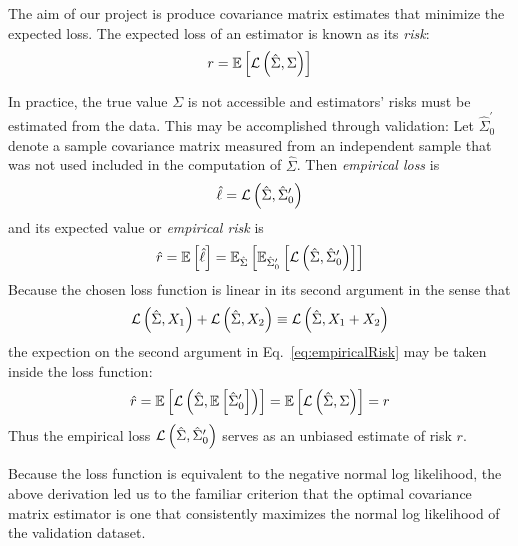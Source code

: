 The aim of our project is produce covariance matrix estimates that minimize the expected loss.  The expected loss of an estimator is known as its \emph{risk}: 
\begin{equation}
r = \mathbb E\left[ \mathcal L\left(\hat\Sigma, \Sigma\right)\right]
\end{equation}

In practice, the true value $\Sigma$ is not accessible and estimators' risks must be estimated from the data.  This may be accomplished through validation: 
Let $\hat\Sigma_0^\prime$ denote a sample covariance matrix measured from an independent sample that was not used included in the computation of $\hat\Sigma$. Then \emph{empirical loss} is 
\begin{equation}
\hat \ell = \mathcal L\left(\hat\Sigma,\hat\Sigma_0^\prime\right)
\end{equation}
 and its expected value or \emph{empirical risk} is
 \begin{equation}\label{eq:empiricalRisk}
 \hat r = \mathbb E\left[ \hat\ell\right] = \mathbb E_{\hat\Sigma} \left[ \mathbb E_{\hat\Sigma_0^\prime} \left[ {\mathcal L\left(\hat\Sigma,\hat\Sigma_0^\prime\right)} \right] \right]
 \end{equation}
 Because the chosen loss function is linear in its second argument in the sense that
 \begin{equation}
 \mathcal L\left(\hat\Sigma,X_1\right) + \mathcal L\left(\hat\Sigma,X_2\right) \equiv \mathcal L\left(\hat\Sigma,X_1+X_2\right)
 \end{equation}
 the expection on the second argument in Eq.~\ref{eq:empiricalRisk} may be taken inside the loss function:
 \begin{equation}
 \hat r = \mathbb E\left[ \mathcal L\left(\hat\Sigma,\mathbb E\left[ \hat\Sigma_0^\prime\right]\right)\right]  = \mathbb E\left[ \mathcal L\left(\hat\Sigma,\Sigma\right)\right] = r
 \end{equation}
 Thus the empirical loss $\mathcal L\left(\hat \Sigma,\hat \Sigma_0^\prime\right)$ serves as an unbiased estimate of risk $r$. 

 Because the loss function is equivalent to the negative normal log likelihood, the above derivation led us to the familiar criterion that the optimal covariance matrix estimator is one that consistently maximizes the normal log likelihood of the validation dataset.


